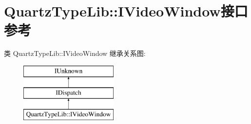 \hypertarget{interface_quartz_type_lib_1_1_i_video_window}{}\section{Quartz\+Type\+Lib\+:\+:I\+Video\+Window接口 参考}
\label{interface_quartz_type_lib_1_1_i_video_window}
类 Quartz\+Type\+Lib\+:\+:I\+Video\+Window 继承关系图\+:\begin{figure}[H]
\begin{center}
\leavevmode
\includegraphics[height=3.000000cm]{interface_quartz_type_lib_1_1_i_video_window}
\end{center}
\end{figure}
